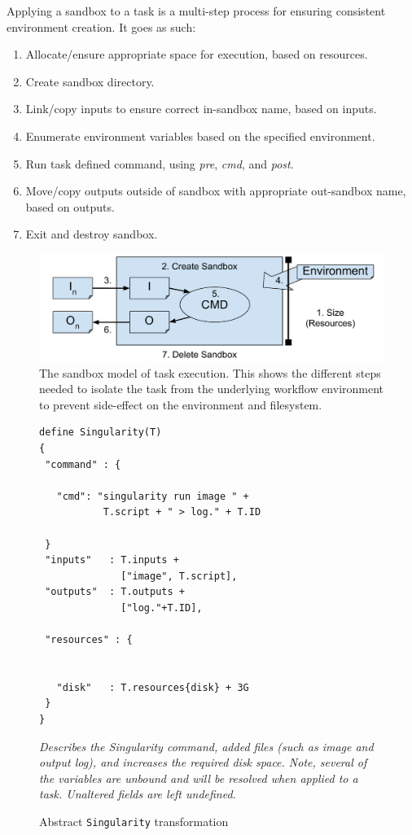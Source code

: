 \documentclass[conference]{IEEEtran}
\begin{document}
Applying a sandbox to a task is 
a multi-step process for ensuring consistent environment creation.
It goes as such:
\begin{enumerate}
    \item Allocate/ensure appropriate space for execution, based on resources.
    \item Create sandbox directory.
    \item Link/copy inputs to ensure correct in-sandbox name, based on inputs.
    \item Enumerate environment variables based on the specified environment.
    \item Run task defined command, 
    using \emph{pre}, \emph{cmd}, and \emph{post}.
    \item Move/copy outputs outside of sandbox with appropriate out-sandbox name, based on outputs.
    \item Exit and destroy sandbox.
\end{enumerate}


\begin{figure}[H]
\includegraphics[width=\columnwidth]{graphics/sandboxing_short.pdf}
\caption{The sandbox model of task execution.
This shows the different steps needed to isolate
the task from the underlying workflow environment
to prevent side-effect on the environment and 
filesystem.}
\label{fig:sandbox}
\end{figure}


\begin{figure}[t]
\begin{framed}
\begin{verbatim}
define Singularity(T) 
{
 "command" : {
 
   "cmd": "singularity run image " +
           T.script + " > log." + T.ID
         
 }
 "inputs"   : T.inputs + 
              ["image", T.script],
 "outputs"  : T.outputs +
              ["log."+T.ID],
              
 "resources" : {
 
 
   "disk"   : T.resources{disk} + 3G
 }
}
\end{verbatim}
\end{framed}
\caption{Abstract {\tt Singularity} transformation}
\small
\emph{Describes the Singularity command, added files
(such as image and output log), and increases
the required disk space. Note, several of the
variables are unbound and will be resolved when
applied to a task. Unaltered fields are left
undefined.}
\label{sing-wrap}
\end{figure}
\end{document}
